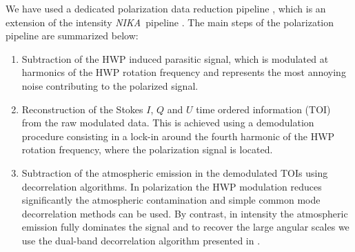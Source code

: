 \documentclass[twocolumn,traditabstract]{aa}
\def\NIKA{\textit{NIKA}}
\begin{document}
We have used a dedicated polarization data reduction pipeline \citep{ritacco2017}, which is an extension of the intensity \NIKA\ pipeline \citep{catalano2014,adam2013}. The main steps of the polarization pipeline are summarized below:
\begin{enumerate}
\item  Subtraction of the HWP induced parasitic signal, which is modulated at harmonics of the HWP rotation frequency and represents the most annoying noise contributing to the polarized signal. 
\item Reconstruction of the Stokes $I$, $Q$ and $U$ time ordered information (TOI) from the raw modulated data. This is achieved using a demodulation procedure consisting in a lock-in around the fourth harmonic of the HWP rotation frequency, where the polarization signal is located.
\item Subtraction of the atmospheric emission in the demodulated TOIs using decorrelation algorithms. In polarization the HWP modulation reduces significantly the atmospheric contamination and simple common mode decorrelation methods can be used. By contrast, in intensity the atmospheric emission fully dominates the signal and to recover the large angular scales we use the dual-band decorrelation algorithm presented in \cite{adam2013}.



\end{enumerate}
\end{document}
